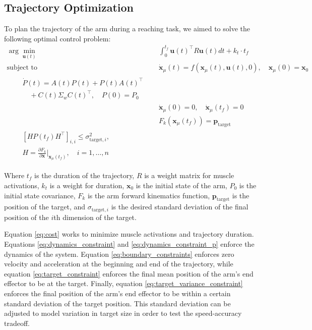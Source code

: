 \documentclass[letterpaper, 10pt, conference]{ieeeconf}
\begin{document}
\subsection{Trajectory Optimization}
To plan the trajectory of the arm during a reaching task, we aimed to solve the following optimal control problem:
\begin{align}
    \arg\min_{\mathbf{u}(t)} &\quad \int_0^{t_f} \mathbf{u}(t)^\top R \mathbf{u}(t) dt + k_t \cdot t_f \label{eq:cost} \\
    \text{subject to} &\quad \dot{\mathbf{x}}_\mu(t) = f(\mathbf{x}_\mu(t), \mathbf{u}(t), 0), \quad \mathbf{x}_\mu(0) = \mathbf{x}_0 \label{eq:dynamics_constraint} \\
    \begin{split}
    &\quad \dot{P}(t) = A(t)P(t) + P(t)A(t)^\top \\
    &\quad \quad + C(t) \Sigma_w C(t)^\top, \quad P(0) = P_0 
    \end{split}\label{eq:dynamics_constraint_p} \\
    &\quad \dot{\mathbf{x}}_\mu(0) = 0, \quad \dot{\mathbf{x}}_\mu(t_f) = 0 \label{eq:boundary_constraints} \\
    &\quad F_k(\mathbf{x}_\mu(t_f)) = \mathbf{p}_{\text{target}} \label{eq:target_constraint} \\
    \begin{split}
    &\quad [HP(t_f)H^\top]_{i,i} \leq \sigma_{\text{target}, i}^2, \\
    &\quad H = \frac{\partial F_k}{\partial \mathbf{x}}\bigg|_{\mathbf{x}_\mu(t_f)}, \quad i = 1, \ldots, n 
    \end{split}\label{eq:target_variance_constraint}
\end{align}

Where $t_f$ is the duration of the trajectory, $R$ is a weight matrix for muscle activations, $k_t$ is a weight for duration, $\mathbf{x}_0$ is the initial state of the arm, $P_0$ is the initial state covariance, $F_k$ is the arm forward kinematics function, $\mathbf{p}_{\text{target}}$ is the position of the target, and $\sigma_{\text{target}, i}$ is the desired standard deviation of the final position of the $i$th dimension of the target.

Equation \ref{eq:cost} works to minimize muscle activations and trajectory duration. Equations \ref{eq:dynamics_constraint} and \ref{eq:dynamics_constraint_p} enforce the dynamics of the system. Equation \ref{eq:boundary_constraints} enforces zero velocity and acceleration at the beginning and end of the trajectory, while equation \ref{eq:target_constraint} enforces the final mean position of the arm's end effector to be at the target. Finally, equation \ref{eq:target_variance_constraint} enforces the final position of the arm's end effector to be within a certain standard deviation of the target position. This standard deviation can be adjusted to model variation in target size in order to test the speed-accuracy tradeoff.
\end{document}
